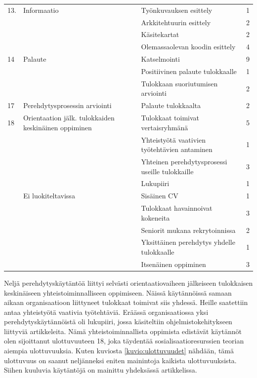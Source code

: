 \documentclass[utf8]{gradu3}
\begin{document}
\begin{scriptsize}
\begin{longtable}[c]{llll}
    \hline
    13. & Informaatio & Työnkuvauksen esittely & 1\\
    & & Arkkitehtuurin esittely & 2\\
    & & Käsitekartat & 2\\
    & & Olemassaolevan koodin esittely & 4\\
    \hline
    14 & Palaute & Katselmointi & 9\\
    & & Positiivinen palaute tulokkaalle & 1\\
    & & Tulokkaan suoriutumisen arviointi & 2\\
    \hline
    17 & Perehdytysprosessin arviointi & Palaute tulokkaalta & 2\\
    \hline
    18 & Orientaation jälk. tulokkaiden keskinäinen oppiminen & Tulokkaat toimivat vertaisryhmänä & 5\\
    & & Yhteistyötä vaativien työtehtävien antaminen & 1\\
    & & Yhteinen perehdytysprosessi useille tulokkaille & 3\\
    & & Lukupiiri & 1\\
    \hline
    & Ei luokiteltavissa & Sisäinen CV & 1 \\
    & & Tulokkaat havainnoivat kokeneita & 3\\
    & & Seniorit mukana rekrytoinnissa & 2\\
    & & Yksittäinen perehdytys yhdelle tulokkaalle & 1\\
    & & Itsenäinen oppiminen & 3\\
    
    \end{longtable}
    \end{scriptsize}

Neljä perehdytyskäytäntöä liittyi selvästi orientaatiovaiheen jälkeiseen tulokkaisen keskinäiseen yhteistoiminnalliseen oppimiseen. Näissä käytännöissä samaan aikaan organisaatioon liittyneet tulokkaat toimivat siis yhdessä. Heille saatettiin antaa yhteistyötä vaativia työtehtäviä. Eräässä organisaatiossa yksi perehdytyskäytännöistä oli lukupiiri, jossa käsiteltiin ohjelmistokehitykseen liittyviä artikkeleita. Nämä yhteistoiminnallista oppimista edistävät käytännöt olen sijoittanut ulottuvuuteen 18, joka täydentää sosialisaatioresurssien teorian aiempia ulottuvuuksia. Kuten kuviosta \ref{kuvio:ulottuvuudet} nähdään, tämä ulottuvuus on saanut neljänneksi eniten mainintoja kaikista ulottuvuuksista. Siihen kuuluvia käytäntöjä on mainittu yhdeksässä artikkelissa. 
\end{document}
